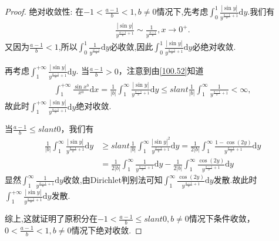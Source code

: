 \documentclass[../../main.tex]{subfiles}
\begin{document}
\begin{proof}
{\heiti 绝对收敛性:} 在\(-1 < \frac{a - 1}{b} < 1, b\neq 0\)情况下,先考虑$\int_0^1{\frac{\left| \sin y \right|}{y^{\frac{a-1}{b}+1}}\mathrm{d}y}$.我们有
\begin{align*}
\frac{\left| \sin y \right|}{y^{\frac{a-1}{b}+1}}\sim \frac{1}{y^{\frac{a-1}{b}}},x\rightarrow 0^+.
\end{align*}
又因为$\frac{a-1}{b}<1$,所以$\int_0^1{\frac{1}{y^{\frac{a-1}{b}}}\mathrm{d}y}$必收敛,因此$\int_0^1{\frac{\left| \sin y \right|}{y^{\frac{a-1}{b}+1}}\mathrm{d}y}$必绝对收敛.

再考虑$\int_{1}^{+\infty}{\frac{\left| \sin y \right|}{y^{\frac{a-1}{b}+1}}\mathrm{d}y}$.
当\(\frac{a - 1}{b}>0\)，注意到由\eqref{100.52}知道
\begin{align*}
\int_{1}^{+\infty}\frac{\sin x^b}{x^a}\mathrm{d}x=\frac{1}{|b|}\int_{1}^{\infty}\frac{|\sin y|}{y^{\frac{a - 1}{b}+1}}\mathrm{d}y \leqslant slant \frac{1}{|b|}\int_{1}^{\infty}\frac{1}{y^{\frac{a - 1}{b}+1}} < \infty,
\end{align*}
故此时$\int_{1}^{+\infty}{\frac{\left| \sin y \right|}{y^{\frac{a-1}{b}+1}}\mathrm{d}y}$绝对收敛.

当\(\frac{a - 1}{b}\leqslant slant 0\)，我们有
\begin{align*}
\frac{1}{|b|}\int_{1}^{\infty}\frac{|\sin y|}{y^{\frac{a - 1}{b}+1}}\mathrm{d}y &\geqslant slant \frac{1}{|b|}\int_{1}^{\infty}\frac{|\sin y|^2}{y^{\frac{a - 1}{b}+1}}\mathrm{d}y = \frac{1}{2|b|}\int_{1}^{\infty}\frac{1 - \cos(2y)}{y^{\frac{a - 1}{b}+1}}\mathrm{d}y \\
&= \frac{1}{2|b|}\int_{1}^{\infty}\frac{1}{y^{\frac{a - 1}{b}+1}}\mathrm{d}y - \frac{1}{2|b|}\int_{1}^{\infty}\frac{\cos(2y)}{y^{\frac{a - 1}{b}+1}}\mathrm{d}y
\end{align*}
显然$\int_{1}^{\infty}\frac{1}{y^{\frac{a - 1}{b}+1}}\mathrm{d}y$收敛,由Dirichlet判别法可知$\int_{1}^{\infty}\frac{\cos(2y)}{y^{\frac{a - 1}{b}+1}}\mathrm{d}y$发散.故此时$\int_{1}^{+\infty}{\frac{\left| \sin y \right|}{y^{\frac{a-1}{b}+1}}\mathrm{d}y}$发散.

综上,这就证明了原积分在\(-1 < \frac{a - 1}{b} \leqslant slant 0, b\neq 0\)情况下条件收敛，\(0 < \frac{a - 1}{b} < 1, b\neq 0\)情况下绝对收敛. 
\end{proof}
\end{document}
